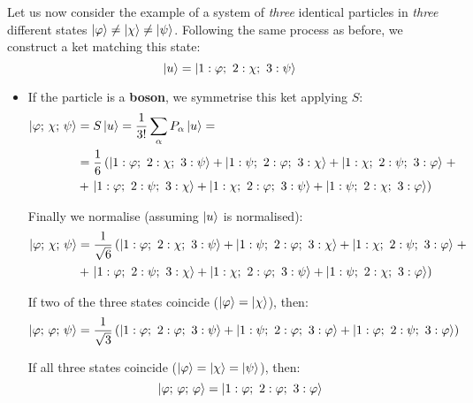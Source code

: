 Let us now consider the example of a system of \textit{three} identical particles in \textit{three} different states $\ket{\varphi}\neq \ket{\chi}\neq \ket{\psi}$. Following the same process as before, we construct a ket matching this state:
\begin{equation}
    \ket{u} = \ket{1:\varphi;\ 2:\chi;\ 3: \psi}
\end{equation} 

\begin{itemize}
    \item If the particle is a \textbf{boson}, we symmetrise this ket applying $S$:
    \begin{equation}
        \begin{split}
            \ket{\varphi;\, \chi;\, \psi} &= S\ket{u} = \frac{1}{3!}\sum_{\alpha} P_\alpha\ket{u} = \\
            &= \frac{1}{6} \left(\ket{1:\varphi;\ 2:\chi;\ 3: \psi} + \ket{1:\psi;\ 2:\varphi;\ 3: \chi} + \ket{1:\chi;\ 2:\psi;\ 3: \varphi}\right. +\\ 
            &+ \left.\ket{1:\varphi;\ 2:\psi;\ 3: \chi} + \ket{1:\chi;\ 2:\varphi;\ 3: \psi} + \ket{1:\psi;\ 2:\chi;\ 3: \varphi}\right)
        \end{split}
    \end{equation}

    Finally we normalise (assuming $\ket{u}$ is normalised):
    \begin{equation}
        \begin{split}
            \ket{\varphi;\, \chi;\, \psi} &= \frac{1}{ \sqrt{6}} \left(\ket{1:\varphi;\ 2:\chi;\ 3: \psi} + \ket{1:\psi;\ 2:\varphi;\ 3: \chi} + \ket{1:\chi;\ 2:\psi;\ 3: \varphi}\right. +\\ 
            &+ \left.\ket{1:\varphi;\ 2:\psi;\ 3: \chi} + \ket{1:\chi;\ 2:\varphi;\ 3: \psi} + \ket{1:\psi;\ 2:\chi;\ 3: \varphi}\right)
        \end{split}
    \end{equation}
    
    If two of the three states coincide ($\ket{\varphi} = \ket{\chi}$), then:
    \begin{equation}
        \ket{\varphi;\, \varphi;\, \psi} = \frac{1}{ \sqrt{3}} \left(\ket{1:\varphi;\ 2:\varphi;\ 3: \psi} + \ket{1:\psi;\ 2:\varphi;\ 3: \varphi} + \ket{1:\varphi;\ 2:\psi;\ 3: \varphi}\right)
    \end{equation}

    If all three states coincide ($\ket{\varphi} = \ket{\chi}=\ket{\psi}$), then:
    \begin{equation}
        \ket{\varphi;\, \varphi;\, \varphi} = \ket{1:\varphi;\ 2:\varphi;\ 3: \varphi}
    \end{equation}


\end{itemize}
